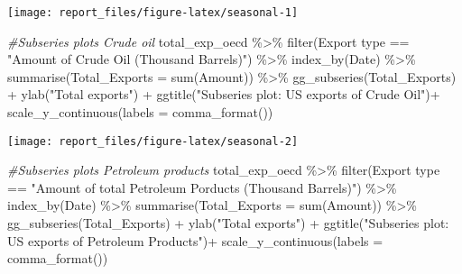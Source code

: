 \documentclass[
]{article}
\newenvironment{Shaded}{\begin{snugshade}}{\end{snugshade}}
\newcommand{\AttributeTok}[1]{\textcolor[rgb]{0.77,0.63,0.00}{#1}}
\newcommand{\CommentTok}[1]{\textcolor[rgb]{0.56,0.35,0.01}{\textit{#1}}}
\newcommand{\FunctionTok}[1]{\textcolor[rgb]{0.00,0.00,0.00}{#1}}
\newcommand{\NormalTok}[1]{#1}
\newcommand{\SpecialCharTok}[1]{\textcolor[rgb]{0.00,0.00,0.00}{#1}}
\newcommand{\StringTok}[1]{\textcolor[rgb]{0.31,0.60,0.02}{#1}}
\begin{document}
\begin{center}\texttt{[image: report\_files/figure-latex/seasonal-1]} \end{center}

\begin{Shaded}
\begin{Highlighting}[]
\CommentTok{\#Subseries plots Crude oil}
\NormalTok{total\_exp\_oecd }\SpecialCharTok{\%\textgreater{}\%} \FunctionTok{filter}\NormalTok{(}\StringTok{\textasciigrave{}}\AttributeTok{Export type}\StringTok{\textasciigrave{}} \SpecialCharTok{==} \StringTok{"Amount of Crude Oil (Thousand Barrels)"}\NormalTok{) }\SpecialCharTok{\%\textgreater{}\%} 
  \FunctionTok{index\_by}\NormalTok{(Date) }\SpecialCharTok{\%\textgreater{}\%} 
  \FunctionTok{summarise}\NormalTok{(}\AttributeTok{Total\_Exports =} \FunctionTok{sum}\NormalTok{(}\StringTok{\textasciigrave{}}\AttributeTok{Amount}\StringTok{\textasciigrave{}}\NormalTok{)) }\SpecialCharTok{\%\textgreater{}\%} 
  \FunctionTok{gg\_subseries}\NormalTok{(Total\_Exports) }\SpecialCharTok{+} 
  \FunctionTok{ylab}\NormalTok{(}\StringTok{"Total exports"}\NormalTok{) }\SpecialCharTok{+} 
  \FunctionTok{ggtitle}\NormalTok{(}\StringTok{"Subseries plot: US exports of Crude Oil"}\NormalTok{)}\SpecialCharTok{+}
  \FunctionTok{scale\_y\_continuous}\NormalTok{(}\AttributeTok{labels =} \FunctionTok{comma\_format}\NormalTok{())}
\end{Highlighting}
\end{Shaded}

\begin{center}\texttt{[image: report\_files/figure-latex/seasonal-2]} \end{center}

\begin{Shaded}
\begin{Highlighting}[]
\CommentTok{\#Subseries plots Petroleum products}
\NormalTok{total\_exp\_oecd }\SpecialCharTok{\%\textgreater{}\%} \FunctionTok{filter}\NormalTok{(}\StringTok{\textasciigrave{}}\AttributeTok{Export type}\StringTok{\textasciigrave{}} \SpecialCharTok{==} \StringTok{"Amount of total Petroleum Porducts (Thousand Barrels)"}\NormalTok{) }\SpecialCharTok{\%\textgreater{}\%} 
  \FunctionTok{index\_by}\NormalTok{(Date) }\SpecialCharTok{\%\textgreater{}\%} 
  \FunctionTok{summarise}\NormalTok{(}\AttributeTok{Total\_Exports =} \FunctionTok{sum}\NormalTok{(}\StringTok{\textasciigrave{}}\AttributeTok{Amount}\StringTok{\textasciigrave{}}\NormalTok{)) }\SpecialCharTok{\%\textgreater{}\%} 
  \FunctionTok{gg\_subseries}\NormalTok{(Total\_Exports) }\SpecialCharTok{+} 
  \FunctionTok{ylab}\NormalTok{(}\StringTok{"Total exports"}\NormalTok{) }\SpecialCharTok{+} 
  \FunctionTok{ggtitle}\NormalTok{(}\StringTok{"Subseries plot: US exports of Petroleum Products"}\NormalTok{)}\SpecialCharTok{+}
  \FunctionTok{scale\_y\_continuous}\NormalTok{(}\AttributeTok{labels =} \FunctionTok{comma\_format}\NormalTok{())}
\end{Highlighting}
\end{Shaded}
\end{document}
